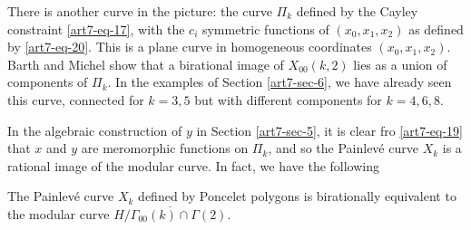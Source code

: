 There is another curve in the picture: the curve $\Pi_{k}$ defined by the Cayley constraint \eqref{art7-eq-17}, with the $c_{i}$ symmetric functions of $(x_{0}, x_{1},x_{2})$ as defined by \eqref{art7-eq-20}. This is a plane curve in homogeneous coordinates $(x_{0},x_{1},x_{2})$. Barth and Michel show that a birational image of $X_{00}(k,2)$ lies as a union of components of $\Pi_{k}$. In the examples of Section \ref{art7-sec-6}, we have already seen this curve, connected for $k=3,5$ but with different components for $k=4,6,8$.

In the algebraic construction of $y$ in Section \ref{art7-sec-5}, it is clear fro \eqref{art7-eq-19} that $x$ and $y$ are meromorphic functions on $\Pi_{k}$, and so the Painlev\'e curve $X_{k}$ is a rational image of the modular curve. In fact, we have the following

\begin{proposition}\label{art7-proposition-7}
The Painlev\'e curve $X_{k}$ defined by Poncelet polygons is birationally equivalent to the modular curve $\overline{H/\Gamma_{00}(k)\cap \Gamma(2)}$.
\end{proposition}

